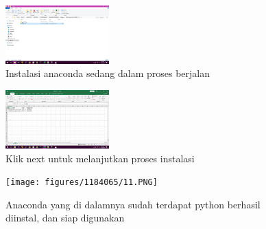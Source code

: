 	\begin{figure}[H]
		\includegraphics[width=4cm]{figures/1184065/9.PNG}
		\centering
		\caption{Instalasi anaconda sedang dalam proses berjalan}
	\end{figure}
	\begin{figure}[H]
		\includegraphics[width=4cm]{figures/1184065/10.PNG}
		\centering
		\caption{Klik next untuk melanjutkan proses instalasi}
	\end{figure}
	\begin{figure}[H]
		\texttt{[image: figures/1184065/11.PNG]}
		\centering
		\caption{Anaconda yang di dalamnya sudah terdapat python berhasil diinstal, dan siap digunakan}
	\end{figure}

